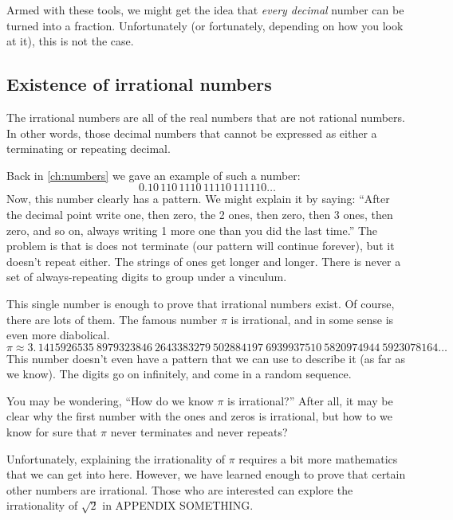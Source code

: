 Armed with these tools, we might get the idea that \textit{every decimal} number can be turned into a fraction. Unfortunately (or fortunately, depending on how you look at it), this is not the case.

\subsection{Existence of irrational numbers}

The \glspl{irrational number} are all of the real numbers that are not rational numbers. In other words, those decimal numbers that cannot be expressed as either a terminating or repeating decimal.

Back in \cref{ch:numbers} we gave an example of such a number: \[0.10\,110\,1110\,11110\,111110\ldots\]
Now, this number clearly has a pattern. We might explain it by saying: ``After the decimal point write one, then zero, the 2 ones, then zero, then 3 ones, then zero, and so on, always writing 1 more one than you did the last time.'' The problem is that is does not terminate (our pattern will continue forever), but it doesn't repeat either. The strings of ones get longer and longer. There is never a set of always-repeating digits to group under a vinculum.

This single number is enough to prove that irrational numbers exist. Of course, there are lots of them. The famous number $\pi$ is irrational, and in some sense is even more diabolical.
\[\pi \approx 3. \, 1415926535 ~ 8979323846 ~ 2643383279 ~ 502884197 ~ 6939937510 ~ 5820974944 ~ 5923078164\ldots\]
This number doesn't even have a pattern that we can use to describe it (as far as we know). The digits go on infinitely, and come in a random sequence.

You may be wondering, ``How do we know $\pi$ is irrational?'' After all, it may be clear why the first number with the ones and zeros is irrational, but how to we know for sure that $\pi$ never terminates and never repeats?

Unfortunately, explaining the irrationality of $\pi$ requires a bit more mathematics that we can get into here. However, we have learned enough to prove that certain other numbers are irrational. Those who are interested can explore the irrationality of $\sqrt{2}$ in APPENDIX SOMETHING.

